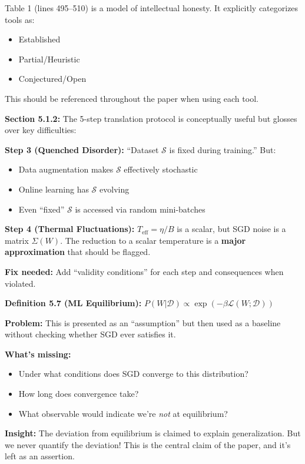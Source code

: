 \documentclass[11pt]{article}
\begin{document}
\begin{insightbox}
Table 1 (lines 495--510) is a model of intellectual honesty. It explicitly categorizes tools as:
\begin{itemize}
    \item \textcolor{green!60!black}{Established}
    \item \textcolor{orange!80!black}{Partial/Heuristic}
    \item \textcolor{red!70!black}{Conjectured/Open}
\end{itemize}
This should be referenced throughout the paper when using each tool.
\end{insightbox}

\begin{handwavebox}
\textbf{Section 5.1.2:} The 5-step translation protocol is conceptually useful but glosses over key difficulties:

\textbf{Step 3 (Quenched Disorder):} ``Dataset $\mathcal{S}$ is fixed during training.'' But:
\begin{itemize}
    \item Data augmentation makes $\mathcal{S}$ effectively stochastic
    \item Online learning has $\mathcal{S}$ evolving
    \item Even ``fixed'' $\mathcal{S}$ is accessed via random mini-batches
\end{itemize}

\textbf{Step 4 (Thermal Fluctuations):} $T_{\mathrm{eff}} = \eta/B$ is a scalar, but SGD noise is a matrix $\Sigma(W)$. The reduction to a scalar temperature is a \textbf{major approximation} that should be flagged.

\textbf{Fix needed:} Add ``validity conditions'' for each step and consequences when violated.
\end{handwavebox}

\begin{vuongmacbox}
\textbf{Definition 5.7 (ML Equilibrium):} $P(W|\mathcal{D}) \propto \exp(-\beta \mathcal{L}(W;\mathcal{D}))$

\textbf{Problem:} This is presented as an ``assumption'' but then used as a baseline without checking whether SGD ever satisfies it.

\textbf{What's missing:}
\begin{itemize}
    \item Under what conditions does SGD converge to this distribution?
    \item How long does convergence take?
    \item What observable would indicate we're \emph{not} at equilibrium?
\end{itemize}

\textbf{Insight:} The deviation from equilibrium is claimed to explain generalization. But we never quantify the deviation! This is the central claim of the paper, and it's left as an assertion.
\end{vuongmacbox}
\end{document}
